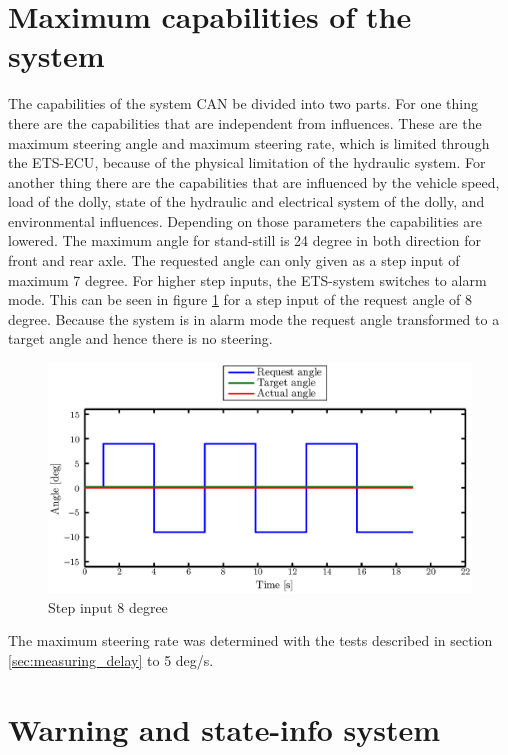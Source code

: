 \documentclass[ExampleMasters.tex]{subfiles}
\begin{document}
\section{Maximum capabilities of the system}
\label{sec:maxi_capabilities}
The capabilities of the system \gls{CAN} be divided into two parts. For one thing there are the capabilities that are independent from influences. These are the maximum steering angle and maximum steering rate, which is limited through the \gls{ETS}-\gls{ECU}, because of the physical limitation of the hydraulic system.
For another thing there are the capabilities that are influenced by the vehicle speed, load of the dolly, state of the hydraulic and electrical system of the dolly, and environmental influences.
Depending on those parameters the capabilities are lowered.
The maximum angle for stand-still is 24 degree in both direction for front and rear axle. 
The requested angle can only given as a step input of maximum 7 degree. For higher step inputs, the \gls{ETS}-system switches to alarm mode. This can be seen in figure \ref{fig:max_step_input} for a step input of the request angle of 8 degree. Because the system is in alarm mode the request angle transformed to a target angle and hence there is no steering.
\begin{figure}[!hbt]
	\centering
	\includegraphics[width=1\linewidth]{figures/step_input_8deg}
	\caption{Step input 8 degree}
	
	\label{fig:max_step_input}
\end{figure}  
The maximum steering rate was determined with the tests described in section \ref{sec:measuring_delay} to 5 deg/s.

\section{Warning and state-info system}
\label{sec:warning_system}
\end{document}
